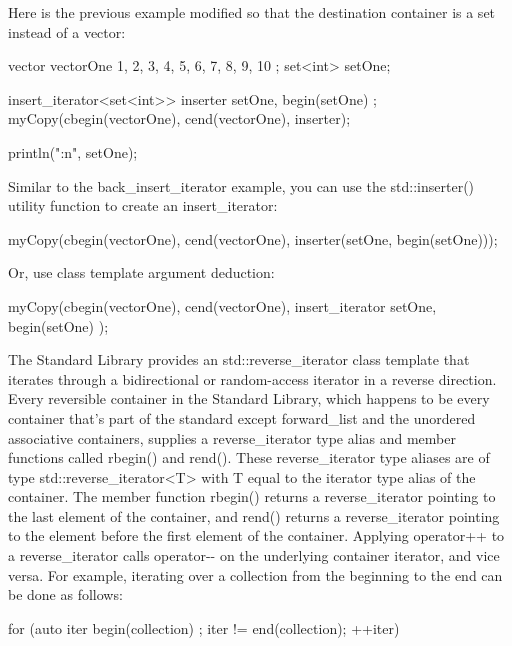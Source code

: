 Here is the previous example modified so that the destination container is a set instead of a vector:

\begin{cpp}
vector vectorOne { 1, 2, 3, 4, 5, 6, 7, 8, 9, 10 };
set<int> setOne;

insert_iterator<set<int>> inserter { setOne, begin(setOne) };
myCopy(cbegin(vectorOne), cend(vectorOne), inserter);

println("{:n}", setOne);
\end{cpp}

Similar to the back\_insert\_iterator example, you can use the std::inserter() utility function to create an insert\_iterator:

\begin{cpp}
myCopy(cbegin(vectorOne), cend(vectorOne), inserter(setOne, begin(setOne)));
\end{cpp}

Or, use class template argument deduction:

\begin{cpp}
myCopy(cbegin(vectorOne), cend(vectorOne),
    insert_iterator { setOne, begin(setOne) });
\end{cpp}



The Standard Library provides an std::reverse\_iterator class template that iterates through a bidirectional or random-access iterator in a reverse direction. Every reversible container in the Standard Library, which happens to be every container that’s part of the standard except forward\_list and the unordered associative containers, supplies a reverse\_iterator type alias and member functions called rbegin() and rend(). These reverse\_iterator type aliases are of type std::reverse\_iterator<T> with T equal to the iterator type alias of the container. The member function rbegin() returns a reverse\_iterator pointing to the last element of the container, and rend() returns a reverse\_iterator pointing to the element before the first element of the container. Applying operator++ to a reverse\_iterator calls operator-{}- on the underlying container iterator, and vice versa. For example, iterating over a collection from the beginning to the end can be done as follows:

\begin{cpp}
for (auto iter { begin(collection) }; iter != end(collection); ++iter) {}
\end{cpp}

